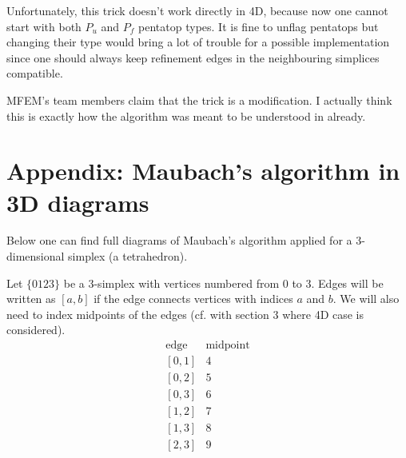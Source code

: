 \documentclass[a4paper,12pt]{amsart}
\numberwithin{equation}{section}
\begin{document}
Unfortunately, this trick doesn't work directly in 4D, because now one cannot start with both $P_u$ and $P_f$ pentatop types. It is fine to unflag pentatops but changing their type would bring a lot of trouble for a possible implementation since one should always keep refinement edges in the neighbouring simplices compatible.

MFEM's team members claim that the trick is a modification.  I actually think this is exactly how the algorithm was meant to be understood in \cite{arnold} already.

\section{Appendix: Maubach's algorithm in 3D diagrams}

Below one can find full diagrams of Maubach's algorithm applied for a 3-dimensional simplex (a tetrahedron).

Let $\{0123\}$ be a 3-simplex with vertices numbered from 0 to 3. Edges will be written as $[a,b]$ if the edge connects vertices with indices $a$ and $b$.
We will also need to index midpoints of the edges (cf. with section 3 where 4D case is considered). 
$$
\begin{array}{cc}
\mbox{edge} & \mbox{midpoint} \\
\left[0,1\right] & 4 \\
\left[0,2\right] & 5 \\
\left[0,3\right] & 6 \\
\left[1,2\right] & 7 \\
\left[1,3\right] & 8 \\
\left[2,3\right] & 9 \\
\end{array}
$$
\end{document}
